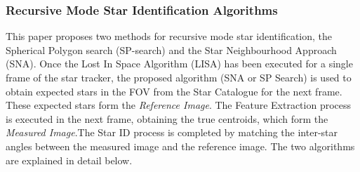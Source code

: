 \documentclass[../../main.tex]{subfiles}
\begin{document}
\subsubsection{Recursive Mode Star Identification Algorithms}
This paper proposes two methods for recursive mode star identification, the Spherical Polygon search (SP-search) and the Star Neighbourhood Approach (SNA). Once the Lost In Space Algorithm (LISA) has been executed for a single frame of the star tracker, the proposed algorithm (SNA or SP Search) is used to obtain expected stars in the FOV from the Star Catalogue for the next frame. These expected stars form the \textit{Reference Image}.
The Feature Extraction process is executed in the next frame, obtaining the true centroids, which form the \textit{Measured Image}.The Star ID process is completed by matching the inter-star angles between the measured image and the reference image. The two algorithms are explained in detail below. 
\end{document}
